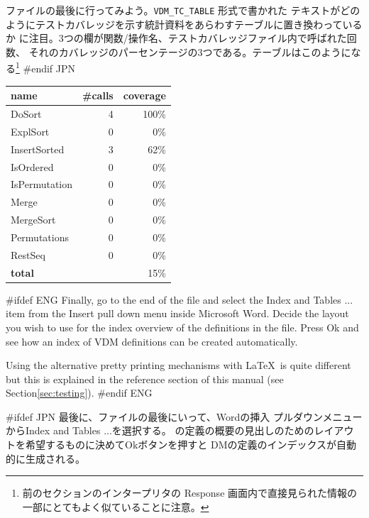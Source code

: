 \documentclass[\pformat,12pt]{article}
\newcommand{\guicmd}[1]{{\sf #1}}
\newcommand{\guicmd}[1]{{\gt #1}}
\begin{document}
ファイルの最後に行ってみよう。{\tt VDM\_TC\_TABLE} 形式で書かれた
テキストがどのようにテストカバレッジを示す統計資料をあらわすテーブルに置き換わっているか
に注目。3つの欄が関数/操作名、テストカバレッジファイル内で呼ばれた回数、
それのカバレッジのパーセンテージの3つである。テーブルはこのようになる\footnote{前のセクションのインタープリタの
\guicmd{Response} 画面内で直接見られた情報の一部にとてもよく似ていることに注意。} 
#endif JPN

\begin{center}
\begin{tabular}{|l|r|r|}\hline
\textbf{name}   & \textbf{\#calls} & \textbf{coverage} \\ \hline
DoSort          & 4     & 100\% \\
ExplSort        & 0     & 0\%\\
InsertSorted    & 3     & 62\%\\
IsOrdered       & 0     & 0\%\\
IsPermutation   & 0     & 0\%\\
Merge           & 0     & 0\%\\
MergeSort       & 0     & 0\%\\
Permutations    & 0     & 0\%\\
RestSeq         & 0     & 0\%\\
\textbf{total}  &       & 15\%\\\hline
\end{tabular} 
\end{center}

#ifdef ENG
Finally, go to the end of the file and select the \guicmd{Index
and Tables ...} item from the \guicmd{Insert} pull down menu inside
Microsoft Word. Decide the layout you wish to use for the index
overview of the definitions in the  file. Press \guicmd{Ok} and see how
an index of VDM definitions can be created automatically.

Using the alternative pretty printing mechanisms with \LaTeX\ is quite
different but this is explained in the reference section of this
manual (see Section\ref{sec:testing}).
#endif ENG

#ifdef JPN
最後に、ファイルの最後にいって、Wordの\guicmd{挿入} プルダウンメニューから\guicmd{Index
and Tables ...}を選択する。
の定義の概要の見出しのためのレイアウトを希望するものに決めて\guicmd{Ok}ボタンを押すと
DMの定義のインデックスが自動的に生成される。
\end{document}
